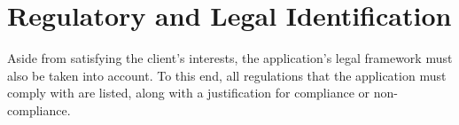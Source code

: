 \section{Regulatory and Legal Identification}

Aside from satisfying the client's interests, the application's legal framework must also be taken into account. To this end, all regulations that the application must comply with are listed, along with a justification for compliance or non-compliance.



\newpage

